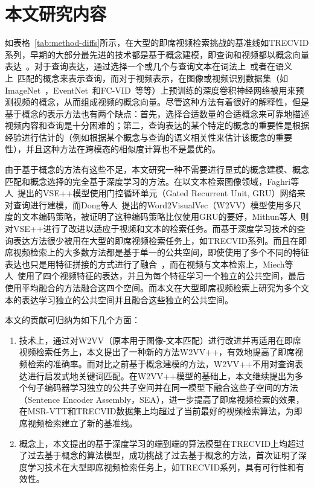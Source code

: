 \section{本文研究内容}
如表格~\ref{tab:method-diffs}所示，在大型的即席视频检索挑战的基准线如TRECVID系列，早期的大部分最先进的技术都是基于概念建模，即查询和视频都以概念向量表达~\cite{le2016nii,foteini2016iti,nguyen2017vireo,ueki2017waseda}。对于查询表达，通过选择一个或几个与查询文本在词法上~\cite{lu2016event,ueki2017waseda}或者在语义上~\cite{markatopoulou2017query,snoek2017university}匹配的概念来表示查询，而对于视频表示，在图像或视频识别数据集（如ImageNet~\cite{deng2009imagenet}，EventNet~\cite{ye2015eventnet}和FC-VID~\cite{jiang2018exploiting}等等）上预训练的深度卷积神经网络被用来预测视频的概念，从而组成视频的概念向量。尽管这种方法有着很好的解释性，但是基于概念的表示方法也有两个缺点：首先，选择合适数量的合适概念来可靠地描述视频内容和查询是十分困难的；第二，查询表达的某个特定的概念的重要性是根据经验进行估计的（例如根据某个概念与查询的语义相关性来估计该概念的重要性），并且这种方法在跨模态的相似度计算也不是最优的。

由于基于概念的方法有这些不足，本文研究一种不需要进行显式的概念建模、概念匹配和概念选择的完全基于深度学习的方法。在以文本检索图像领域，Faghri等人~\cite{faghri2017vse++}提出的VSE++模型使用门控循环单元（Gated Recurrent Unit, GRU）网络来对查询进行建模，而Dong等人~\cite{dong2018predicting}提出的Word2VisualVec（W2VV）模型使用多尺度的文本编码策略，被证明了这种编码策略比仅使用GRU的要好，Mithun等人~\cite{mithun2018learning}则对VSE++进行了改进以适应于视频和文本的检索任务。而基于深度学习技术的查询表达方法很少被用在大型的即席视频检索任务上，如TRECVID系列。而且在即席视频检索上的大多数方法都是基于单一的公共空间，即使使用了多个不同的特征表达也只是用特征拼接的方式进行了融合~\cite{li2018renmin,wu2019hybrid}，而在视频与文本检索上，Miech等人~\cite{miech2018learning}使用了四个视频特征的表达，并且为每个特征学习一个独立的公共空间，最后使用平均融合的方法融合这四个空间。而本文在大型即席视频检索上研究为多个文本的表达学习独立的公共空间并且融合这些独立的公共空间。

本文的贡献可归纳为如下几个方面：
\begin{enumerate}[1.]
\item 技术上，通过对W2VV（原本用于图像-文本匹配）进行改进并再适用在即席视频检索任务上，本文提出了一种新的方法W2VV++，有效地提高了即席视频检索的准确率。而对比之前基于概念建模的方法，W2VV++不用对查询表达进行启发式地关键词匹配。在W2VV++模型的基础上，本文继续提出为多个句子编码器学习独立的公共子空间并在同一模型下融合这些子空间的方法（Sentence Encoder Assembly，SEA），进一步提高了即席视频检索的效果，在MSR-VTT和TRECVID数据集上均超过了当前最好的视频检索算法，为即席视频检索建立了新的基准线。

\item 概念上，本文提出的基于深度学习的端到端的算法模型在TRECVID上均超过了过去基于概念的算法模型，成功挑战了过去基于概念的方法，首次证明了深度学习技术在大型即席视频检索任务上，如TRECVID系列，具有可行性和有效性。

\end{enumerate}

